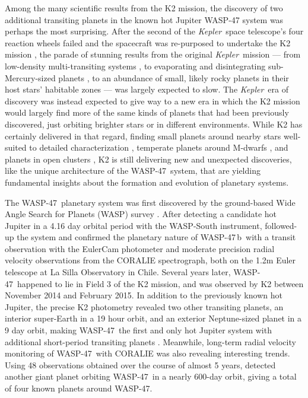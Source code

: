 \documentclass{emulateapj}
\newcommand{\Kepler}{{\it Kepler}}
\newcommand{\thisstar}{WASP-47}
\newcommand{\thisfirstplanet}{WASP-47\,b}
\begin{document}
Among the many scientific results from the K2 mission, the discovery of two additional transiting planets in the known hot Jupiter WASP-47 system was perhaps the most surprising. After the second of the \Kepler\ space telescope's four reaction wheels failed and the spacecraft was re-purposed to undertake the K2 mission \citep{howell}, the parade of stunning results from the original \Kepler\ mission --- from low-density multi-transiting systems \citep{kepler11}, to evaporating and disintegrating sub-Mercury-sized planets \citep{rappaport}, to an abundance of small, likely rocky planets in their host stars' habitable zones \citep{dressingcharbonneau, petigura2, burke} --- was largely expected to slow. The \Kepler\ era of discovery was instead expected to give way to a new era in which the K2 mission would largely find more of the same kinds of planets that had been previously discovered, just orbiting brighter stars or in different environments. While K2 has certainly delivered in that regard, finding small planets around nearby stars well-suited to detailed characterization \citep{hip116454, sinukoffmultis, hip41378, rodriguez, crossfield106}, temperate planets around M-dwarfs \citep{crossfield, petiguratwoearthsized, martinez, dressingk2stars, dressingk2-2}, and planets in open clusters \citep{zeit1, zeit3, david, obermeier, libralato, zeit4},  K2 is still delivering new and unexpected discoveries, like the unique architecture of the \thisstar\ system, that are yielding fundamental insights about the formation and evolution of planetary systems. 

The \thisstar\ planetary system was first discovered by the ground-based Wide Angle Search for Planets (WASP) survey \citep{hellier}. After detecting a candidate hot Jupiter in a 4.16 day orbital period with the WASP-South instrument, \citet{hellier} followed-up the system and confirmed the planetary nature of \thisfirstplanet\ with a transit observation with the EulerCam photometer and moderate precision radial velocity observations from the CORALIE spectrograph, both on the 1.2m Euler telescope at La Silla Observatory in Chile. Several years later, \thisstar\ happened to lie in Field 3 of the K2 mission, and was observed by K2 between November 2014 and February 2015. In addition to the previously known hot Jupiter, the precise K2 photometry revealed two other transiting planets, an interior super-Earth in a 19 hour orbit, and an exterior Neptune-sized planet in a 9 day orbit, making \thisstar\ the first and only hot Jupiter system with additional short-period transiting planets \citep{becker}. Meanwhile, long-term radial velocity monitoring of \thisstar\ with CORALIE was also revealing interesting trends. Using 48 observations obtained over the course of almost 5 years, \citet{neveuvanmalle} detected another giant planet orbiting \thisstar\ in a nearly 600-day orbit, giving a total of four known planets around \thisstar. 
\end{document}
